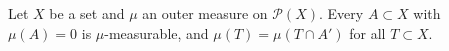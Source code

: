 Let $X$ be a set and $\mu$ an outer measure on $\mathcal{P}(X)$. Every $A \subset X$ with $\mu(A) = 0$ is $\mu$-measurable, and $\mu(T) = \mu(T \cap A')$ for all $T \subset X$.